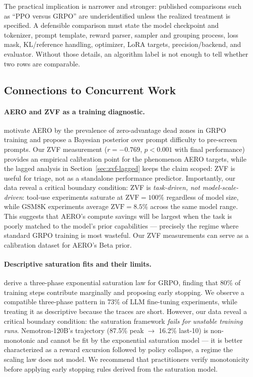 \documentclass{article}
\begin{document}
The practical implication is narrower and stronger: published comparisons
such as ``PPO versus GRPO'' are underidentified unless the realized treatment
is specified.  A defensible comparison must state the model checkpoint and
tokenizer, prompt template, reward parser, sampler and grouping process, loss
mask, KL/reference handling, optimizer, LoRA targets, precision/backend, and
evaluator.  Without those details, an algorithm label is not enough to tell
whether two rows are comparable.

\subsection{Connections to Concurrent Work}
\label{sec:discuss_related}

\paragraph{AERO and ZVF as a training diagnostic.}
\citet{zhang2026aero} motivate AERO by the prevalence of zero-advantage dead
zones in GRPO training and propose a Bayesian posterior over prompt difficulty
to pre-screen prompts.
Our ZVF measurement ($r = -0.769$, $p < 0.001$ with final performance) provides
an empirical calibration point for the phenomenon AERO targets, while the
lagged analysis in Section~\ref{sec:zvf-lagged} keeps the claim scoped:
ZVF is useful for triage, not as a standalone performance predictor.
Importantly, our data reveal a critical boundary condition: ZVF is \emph{task-driven, not model-scale-driven}:
tool-use experiments saturate at $\text{ZVF} = 100\%$ regardless of model size,
while GSM8K experiments average $\text{ZVF} = 8.5\%$ across the same model
range.
This suggests that AERO's compute savings will be largest when the task is
poorly matched to the model's prior capabilities --- precisely the
regime where standard GRPO training is most wasteful.
Our ZVF measurements can serve as a calibration dataset for AERO's Beta prior.

\paragraph{Descriptive saturation fits and their limits.}
\citet{nimmaturi2025scalinglaws} derive a three-phase exponential saturation
law for GRPO, finding that 80\% of training steps contribute marginally and
proposing early stopping.
We observe a compatible three-phase pattern in 73\% of LLM fine-tuning
experiments, while treating it as descriptive because the traces are short.
However, our data reveal a critical boundary condition: the saturation
framework \emph{fails for unstable training runs}.
Nemotron-120B's trajectory (87.5\% peak $\to$ 16.2\% last-10) is
non-monotonic and cannot be fit by the exponential saturation model ---
it is better characterized as a reward excursion followed by policy
collapse, a regime the scaling law does not model.
We recommend that practitioners verify monotonicity before applying early
stopping rules derived from the saturation model.
\end{document}
